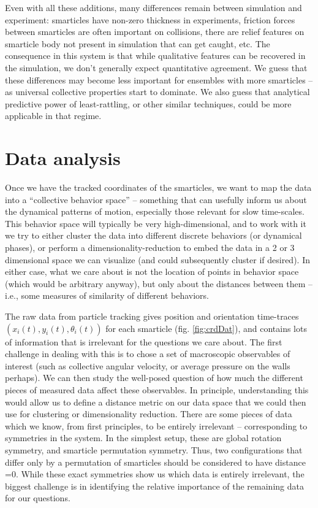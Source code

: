 \documentclass[reprint,prx]{revtex4-1}
\renewcommand{\=}[1]{\stackrel{#1}{=}} %
\renewcommand{\(}{\left (}
\renewcommand{\)}{\right  )}
\renewcommand{\[}{\left [}
\renewcommand{\]}{\right ]}
\newcommand{\<}{\left <}
\renewcommand{\>}{\right >}
\theoremstyle{definition}
\theoremstyle{remark}
\begin{document}
Even with all these additions, many differences remain between simulation and experiment: smarticles have non-zero thickness in experiments, friction forces between smarticles are often important on collisions, there are relief features on smarticle body not present in simulation that can get caught, etc. The consequence in this system is that while qualitative features can be recovered in the simulation, we don't generally expect quantitative agreement. We guess that these differences may become less important for ensembles with more smarticles -- as universal collective properties start to dominate. We also guess that analytical predictive power of least-rattling, or other similar techniques, could be more applicable in that regime.

\section{Data analysis} \label{app:dataAnal}

Once we have the tracked coordinates of the smarticles, we want to map the data into a ``collective behavior space'' -- something that can usefully inform us about the dynamical patterns of motion, especially those relevant for slow time-scales. This behavior space will typically be very high-dimensional, and to work with it we try to either cluster the data into different discrete behaviors (or dynamical phases), or perform a dimensionality-reduction to embed the data in a 2 or 3 dimensional space we can visualize (and could subsequently cluster if desired). In either case, what we care about is not the location of points in behavior space (which would be arbitrary anyway), but only about the distances between them -- i.e., some measures of similarity of different behaviors. 

The raw data from particle tracking gives position and orientation time-traces $ (x_i(t), y_i(t), \theta_i(t)) $ for each smarticle (fig. \ref{fig:crdDat}), and contains lots of information that is irrelevant for the questions we care about. The first challenge in dealing with this is to chose a set of macroscopic observables of interest (such as collective angular velocity, or average pressure on the walls perhaps). We can then study the well-posed question of how much the different pieces of measured data affect these observables. In principle, understanding this would allow us to define a distance metric on our data space that we could then use for clustering or dimensionality reduction. There are some pieces of data which we know, from first principles, to be entirely irrelevant -- corresponding to symmetries in the system. In the simplest setup, these are global rotation symmetry, and smarticle permutation symmetry. Thus, two configurations that differ only by a permutation of smarticles should be considered to have distance =0. While these exact symmetries show us which data is entirely irrelevant, the biggest challenge is in identifying the relative importance of the remaining data for our questions. 
\end{document}
